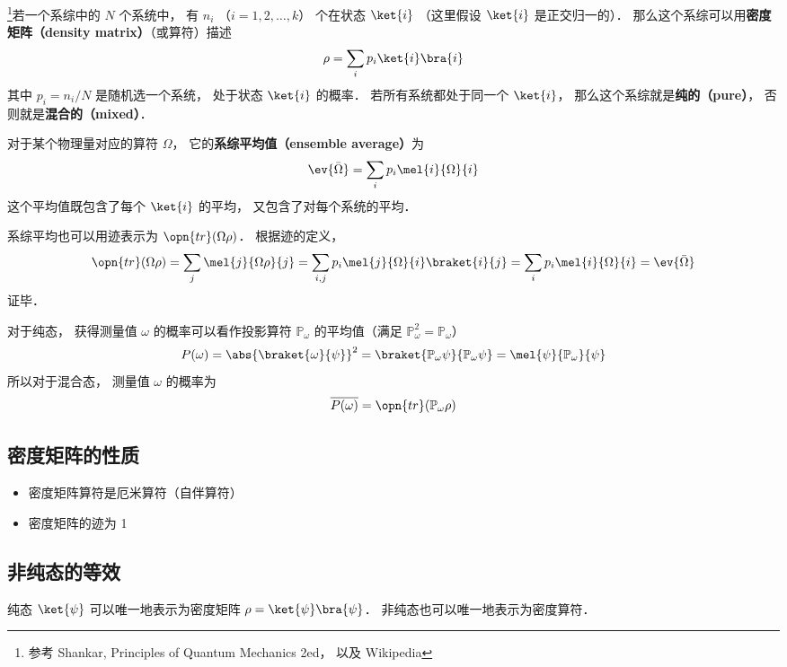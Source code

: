 

\footnote{参考 Shankar, Principles of Quantum Mechanics 2ed， 以及 Wikipedia}若一个系综中的 $N$ 个系统中， 有 $n_i$ （$i = 1,2,\dots,k$） 个在状态 $\ket{i}$ （这里假设 $\ket{i}$ 是正交归一的）． 那么这个系综可以用\textbf{密度矩阵（density matrix）}（或算符）描述
\begin{equation}
\rho = \sum_i p_i\ket{i}\bra{i}   
\end{equation}
其中 $p_i = n_i/N$ 是随机选一个系统， 处于状态 $\ket{i}$ 的概率． 若所有系统都处于同一个 $\ket{i}$， 那么这个系综就是\textbf{纯的（pure）}， 否则就是\textbf{混合的（mixed）}．

对于某个物理量对应的算符 $\Omega$， 它的\textbf{系综平均值（ensemble average）}为
\begin{equation}
\ev{\bar\Omega} = \sum_i p_i \mel{i}{\Omega}{i}
\end{equation}
这个平均值既包含了每个 $\ket{i}$ 的平均， 又包含了对每个系统的平均．

系综平均也可以用迹表示为 $\opn{tr}(\Omega\rho)$． 根据迹的定义，
\begin{equation}
\opn{tr}(\Omega\rho) = \sum_j \mel{j}{\Omega\rho}{j} = \sum_{i,j} p_i\mel{j}{\Omega}{i} \braket{i}{j} = \sum_{i} p_i\mel{i}{\Omega}{i} = \ev{\bar\Omega}
\end{equation}
证毕．

对于纯态， 获得测量值 $\omega$ 的概率可以看作投影算符 $\mathbb P_\omega$ 的平均值（满足 $\mathbb P_\omega^2 = \mathbb P_\omega$）
\begin{equation}
P(\omega) = \abs{\braket{\omega}{\psi}}^2 = \braket{\mathbb P_\omega \psi}{\mathbb P_\omega \psi} = \mel{\psi}{\mathbb P_\omega}{\psi}
\end{equation}
所以对于混合态， 测量值 $\omega$ 的概率为
\begin{equation}
\overline{P(\omega)} = \opn{tr}(\mathbb P_\omega\rho)
\end{equation}

\subsection{密度矩阵的性质}
\begin{itemize}
\item 密度矩阵算符是厄米算符（自伴算符）

\item 密度矩阵的迹为 1
\end{itemize}

\subsection{非纯态的等效}
纯态 $\ket{\psi}$ 可以唯一地表示为密度矩阵 $\rho = \ket{\psi}\bra{\psi}$． 非纯态也可以唯一地表示为密度算符．

